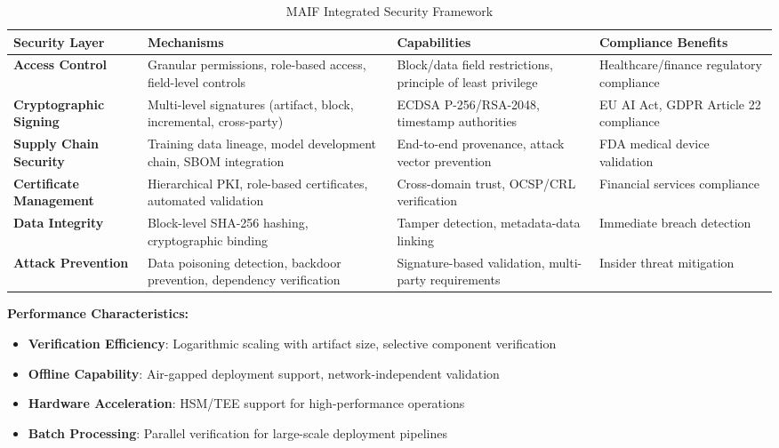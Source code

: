 \documentclass[conference]{IEEEtran}
\begin{document}
\begin{table*}[!t]
\renewcommand{\arraystretch}{1.3}
\caption{MAIF Integrated Security Framework}
\label{tab:integrated-security}
\centering
\footnotesize
\begin{tabular}{p{3cm}p{4.5cm}p{4cm}p{4.5cm}}
\toprule
\textbf{Security Layer} & \textbf{Mechanisms} & \textbf{Capabilities} & \textbf{Compliance Benefits} \\
\midrule
\textbf{Access Control} & Granular permissions, role-based access, field-level controls & Block/data field restrictions, principle of least privilege & Healthcare/finance regulatory compliance \\
\textbf{Cryptographic Signing} & Multi-level signatures (artifact, block, incremental, cross-party) & ECDSA P-256/RSA-2048, timestamp authorities & EU AI Act, GDPR Article 22 compliance \\
\textbf{Supply Chain Security} & Training data lineage, model development chain, SBOM integration & End-to-end provenance, attack vector prevention & FDA medical device validation \\
\textbf{Certificate Management} & Hierarchical PKI, role-based certificates, automated validation & Cross-domain trust, OCSP/CRL verification & Financial services compliance \\
\textbf{Data Integrity} & Block-level SHA-256 hashing, cryptographic binding & Tamper detection, metadata-data linking & Immediate breach detection \\
\textbf{Attack Prevention} & Data poisoning detection, backdoor prevention, dependency verification & Signature-based validation, multi-party requirements & Insider threat mitigation \\
\bottomrule
\end{tabular}
\end{table*}

\textbf{Performance Characteristics:}
\begin{itemize}[leftmargin=*]
\item \textbf{Verification Efficiency}: Logarithmic scaling with artifact size, selective component verification
\item \textbf{Offline Capability}: Air-gapped deployment support, network-independent validation
\item \textbf{Hardware Acceleration}: HSM/TEE support for high-performance operations
\item \textbf{Batch Processing}: Parallel verification for large-scale deployment pipelines
\end{itemize}
\end{document}
